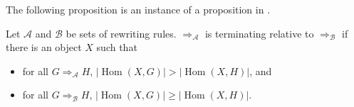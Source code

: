 \noindent The following proposition is an instance of a proposition in \cite[][page 31]{geser1990relative}.
\begin{proposition}
    \label{abstract_termination_criterion}
    Let $\mathcal{A}$ and $\mathcal{B}$ be sets of rewriting rules. \(\Rightarrow_\mathcal{A}\) is terminating relative to \(\Rightarrow_\mathcal{B}\) if there is an object \(X\) such that
\begin{itemize}
    \item for all \(G \Rightarrow_\mathcal{A} H\), \(|\operatorname{Hom}(X,G)| > |\operatorname{Hom}(X,H)|\), and
    \item for all \(G \Rightarrow_\mathcal{B} H\), \(|\operatorname{Hom}(X,G)| \geq |\operatorname{Hom}(X,H)|\).
\end{itemize}
\end{proposition}